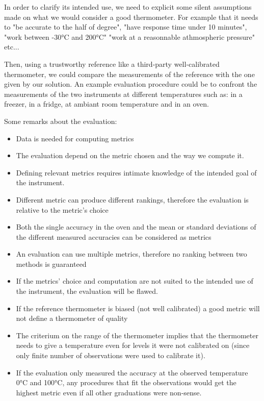 \begin{bibunit}
 In order to clarify its intended use, we need to explicit some silent assumptions made on what we would consider a good thermometer.
  For example that it needs to "be accurate to the half of degree", "have response time under 10 minutes", "work between -30°C and 200°C" "work at a reasonnable athmospheric pressure" etc...

Then, using a trustworthy reference like a third-party well-calibrated thermometer, we could compare the measurements of the reference with the one given by our solution.
  An example evaluation procedure could be to confront the measurements of the two instruments at different temperatures such as: in a freezer, in a fridge, at ambiant room temperature and in an oven.

Some remarks about the evaluation:
\begin{itemize}
\item Data is needed for computing metrics
\item The evaluation depend on the metric chosen and the way we compute it.
\item Defining relevant metrics requires intimate knowledge of the intended goal of the instrument.
\item Different metric can produce different rankings, therefore the evaluation is relative to the metric's choice
\item Both the single accuracy in the oven and the mean or standard deviations of the different measured accuracies can be considered as metrics
\item An evaluation can use multiple metrics, therefore no ranking between two methods is guaranteed
\item If the metrics' choice and computation are not suited to the intended use of the instrument, the evaluation will be flawed.
\item If the reference thermometer is biased (not well calibrated) a good metric will not define a thermometer of quality
\item The criterium on the range of the thermometer implies that the thermometer needs to give a temperature even for levels it were not calibrated on (since only finite number of observations were used to calibrate it).
\item If the evaluation only measured the accuracy at the observed temperature 0°C and 100°C, any procedures that fit the observations would get the highest metric even if all other graduations were non-sense.
\end{itemize}


\end{bibunit}
